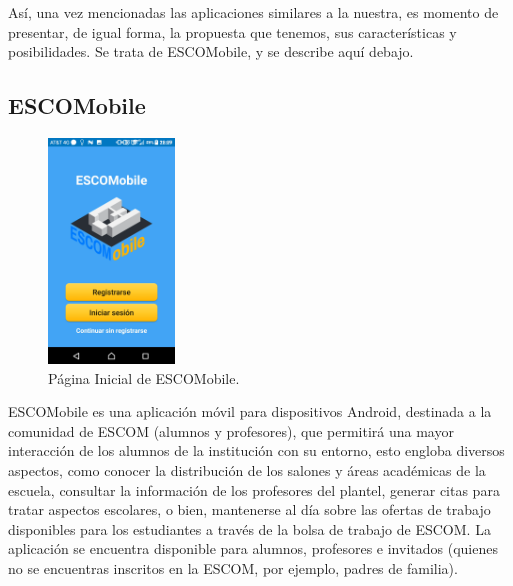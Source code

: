 \noindent
\newline
\newline
Así, una vez mencionadas las aplicaciones similares a la nuestra, es momento de presentar, de igual forma, la propuesta que tenemos, sus características y posibilidades. Se trata de ESCOMobile, y se describe aquí debajo.

\pagebreak
\subsection{ESCOMobile}

	\begin{figure}[htbp!]
		\centering
		\includegraphics[width=0.3\textwidth]{estado_arte/fotosarte/ESCOMobile}
		\caption{Página Inicial de ESCOMobile.}
	\end{figure}

	\noindent
	ESCOMobile es una aplicación móvil para dispositivos Android, destinada a la comunidad de ESCOM (alumnos y profesores), que permitirá una mayor interacción de los alumnos de la institución con su entorno, esto engloba diversos aspectos, como conocer la distribución de los salones y áreas académicas de la escuela, consultar la información de los profesores del plantel, generar citas para tratar aspectos escolares, o bien, mantenerse al día sobre las ofertas de trabajo disponibles para los estudiantes a través de la bolsa de trabajo de ESCOM. La aplicación se encuentra disponible para alumnos, profesores e invitados (quienes no se encuentras inscritos en la ESCOM, por ejemplo, padres de familia). 
	
